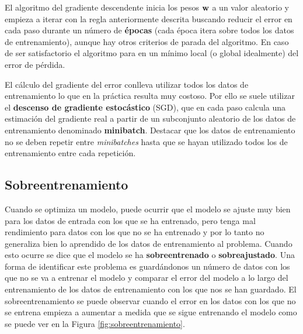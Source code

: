 El algoritmo del gradiente descendente inicia los pesos $\textnormal{\textbf{w}}$ a un valor aleatorio y empieza a iterar con la regla anteriormente descrita buscando reducir el error en cada paso durante un número de \textbf{épocas} (cada época itera sobre todos los datos de entrenamiento), aunque hay otros criterios de parada del algoritmo. En caso de ser satisfactorio el algoritmo para en un mínimo local (o global idealmente) del error de pérdida. 

El cálculo del gradiente del error conlleva utilizar todos los datos de entrenamiento lo que en la práctica resulta muy costoso. Por ello se suele utilizar el \textbf{descenso de gradiente estocástico} (SGD), que en cada paso calcula una estimación del gradiente real a partir de un subconjunto aleatorio de los datos de entrenamiento denominado \textbf{minibatch}. Destacar que los datos de entrenamiento no se deben repetir entre \textit{minibatches} hasta que se hayan utilizado todos los de entrenamiento entre cada repetición.

\subsection*{Sobreentrenamiento}

Cuando se optimiza un modelo, puede ocurrir que el modelo se ajuste muy bien para los datos de entrada con los que se ha entrenado, pero tenga mal rendimiento para datos con los que no se ha entrenado y por lo tanto no generaliza bien lo aprendido de los datos de entrenamiento al problema. Cuando esto ocurre se dice que el modelo se ha \textbf{sobreentrenado} o \textbf{sobreajustado}. Una forma de identificar este problema es guardándonos un número de datos con los que no se va a entrenar el modelo y comparar el error del modelo a lo largo del entrenamiento de los datos de entrenamiento con los que nos se han guardado. El sobreentrenamiento se puede observar cuando el error en los datos con los que no se entrena empieza a aumentar a medida que se sigue entrenando el modelo como se puede ver en la Figura \ref{fig:sobreentrenamiento}.


